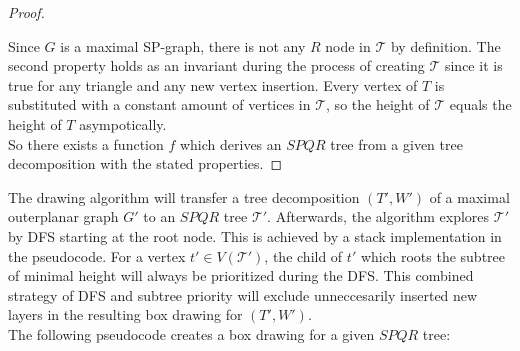 \begin{proof}
\begin{description}
\begin{figure}[H]
		\end{figure}
	\end{description}
	Since $G$ is a maximal SP-graph, there is not any $R$ node in $\mathcal{T}$ by definition. The second property holds as an invariant during the process of creating $\mathcal{T}$ since it is true for any triangle and any new vertex insertion. Every vertex of $T$ is substituted with a constant amount of vertices in $\mathcal{T}$, so the height of $\mathcal{T}$ equals the height of $T$ asympotically.\\
	So there exists a function $f$ which derives an $SPQR$ tree from a given tree decomposition with the stated properties.
\end{proof}
The drawing algorithm will transfer a tree decomposition $(T',W')$ of a maximal outerplanar graph $G'$ to an $SPQR$ tree $\mathcal{T}'$. Afterwards, the algorithm explores $\mathcal{T}'$ by DFS starting at the root node. This is achieved by a stack implementation in the pseudocode. For a vertex $t'\in V(\mathcal{T'})$, the child of $t'$ which roots the subtree of minimal height will always be prioritized during the DFS. This combined strategy of DFS and subtree priority will exclude unneccesarily inserted new layers in the resulting box drawing for $(T',W')$.\\
The following pseudocode creates a box drawing for a given $SPQR$ tree:\\
